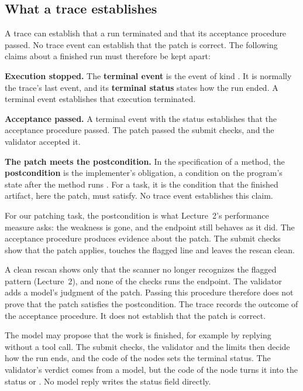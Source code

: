 \subsection{What a trace establishes}
\label{sec:routing-trace}

A trace can establish that a run terminated and that its acceptance procedure passed. No trace event
can establish that the patch is correct. The following claims about a finished run must therefore be
kept apart:
\bi
\item \textbf{Execution stopped.} The \textbf{terminal event} is the event of kind
. It is normally the trace's last event, and its \textbf{terminal status} states
how the run ended. A terminal event establishes that execution terminated.
\item \textbf{Acceptance passed.} A terminal event with the status  establishes
that the acceptance procedure passed. The patch passed the submit checks, and the validator accepted
it.
\item \textbf{The patch meets the postcondition.} In the specification of a method, the
\textbf{postcondition} is the implementer's obligation, a condition on the program's state after the
method runs \citep{mit6031-specs}. For a task, it is the condition that the finished artifact, here
the patch, must satisfy. No trace event establishes this claim.
\ei

For our patching task, the postcondition is what Lecture~2's performance measure asks: the weakness
is gone, and the endpoint still behaves as it did. The acceptance procedure produces evidence about
the patch. The submit checks show that the patch applies, touches the flagged line and leaves the
rescan clean.

A clean rescan shows only that the scanner no longer recognizes the flagged pattern (Lecture~2), and
none of the checks runs the endpoint. The validator adds a model's judgment of the patch. Passing
this procedure therefore does not prove that the patch satisfies the postcondition. The trace records
the outcome of the acceptance procedure. It does not establish that the patch is correct.

The model may propose that the work is finished, for example by replying without a tool call. The
submit checks, the validator and the limits then decide how the run ends, and the code of the nodes
sets the terminal status. The validator's verdict comes from a model, but the code of the
 node turns it into the status  or . No model
reply writes the status field directly.

